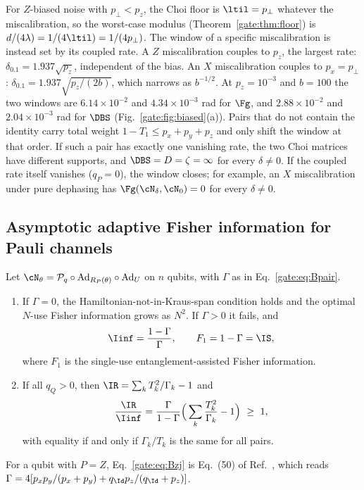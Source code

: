 \begin{remark}\label{gate:rem:Bfloor}
For $Z$-biased noise with $p_\perp<p_z$, the Choi floor is $\ltil=p_\perp$ whatever the miscalibration, so the worst-case modulus (Theorem~\ref{gate:thm:floor}) is $d/(4\lambda)=1/(4\ltil)=1/(4p_\perp)$. The window of a specific miscalibration is instead set by its coupled rate. A $Z$ miscalibration couples to $p_z$, the largest rate: $\delta_{0.1}=1.937\sqrt{p_z}$, independent of the bias. An $X$ miscalibration couples to $p_x=p_\perp$: $\delta_{0.1}=1.937\sqrt{p_z/(2b)}$, which narrows as $b^{-1/2}$. At $p_z=10^{-3}$ and $b=100$ the two windows are $6.14\times10^{-2}$ and $4.34\times10^{-3}$ rad for $\Fg$, and $2.88\times10^{-2}$ and $2.04\times10^{-3}$ rad for $\DBS$ (Fig.~\ref{gate:fig:biased}(a)). Pairs that do not contain the identity carry total weight $1-T_1\le p_x+p_y+p_z$ and only shift the window at that order. If such a pair has exactly one vanishing rate, the two Choi matrices have different supports, and $\DBS=D=\zeta=\infty$ for every $\delta\ne0$. If the coupled rate itself vanishes ($q_P=0$), the window closes; for example, an $X$ miscalibration under pure dephasing has $\Fg(\cN_\delta,\cN_0)=0$ for every $\delta\ne0$.
\end{remark}

\subsection*{Asymptotic adaptive Fisher information for Pauli channels}

\begin{theorem}\label{gate:thm:Bzj}
Let $\cN_\theta=\mathcal P_q\circ\mathrm{Ad}_{R_P(\theta)}\circ\mathrm{Ad}_U$ on $n$ qubits, with $\Gamma$ as in Eq.~\eqref{gate:eq:Bpair}.
\begin{enumerate}
\item[(a)] If $\Gamma=0$, the Hamiltonian-not-in-Kraus-span condition holds and the optimal $N$-use Fisher information grows as $N^2$. If $\Gamma>0$ it fails, and
\begin{equation}\label{gate:eq:Bzj}
\Iinf=\frac{1-\Gamma}{\Gamma},\qquad F_1=1-\Gamma=\IS ,
\end{equation}
where $F_1$ is the single-use entanglement-assisted Fisher information.
\item[(b)] If all $q_Q>0$, then $\IR=\sum_kT_k^2/\Gamma_k-1$ and
\begin{equation}\label{gate:eq:Bratio}
\frac{\IR}{\Iinf}=\frac{\Gamma}{1-\Gamma}\Big(\sum_k\frac{T_k^2}{\Gamma_k}-1\Big)\ \ge\ 1,
\end{equation}
with equality if and only if $\Gamma_k/T_k$ is the same for all pairs.
\end{enumerate}
For a qubit with $P=Z$, Eq.~\eqref{gate:eq:Bzj} is Eq.~(50) of Ref.~\cite{ZhouJiang2021}, which reads $\Gamma=4[p_xp_y/(p_x+p_y)+q_\Id p_z/(q_\Id+p_z)]$.
\end{theorem}

